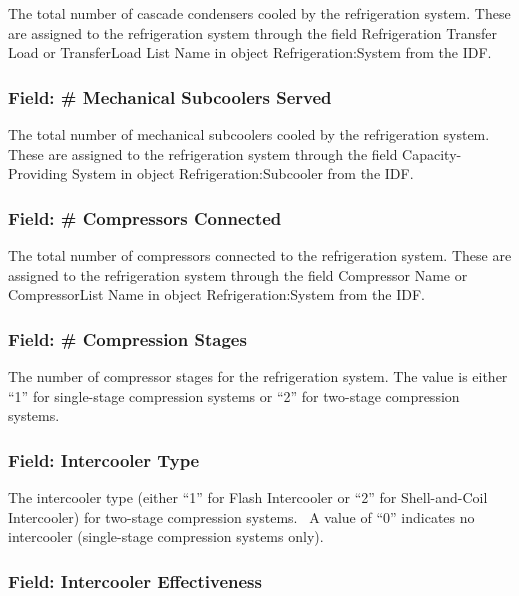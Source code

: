 The total number of cascade condensers cooled by the refrigeration system. These are assigned to the refrigeration system through the field Refrigeration Transfer Load or TransferLoad List Name in object Refrigeration:System from the IDF.

\subsubsection{Field: \# Mechanical Subcoolers Served}\label{field-mechanical-subcoolers-served}

The total number of mechanical subcoolers cooled by the refrigeration system. These are assigned to the refrigeration system through the field Capacity-Providing System in object Refrigeration:Subcooler from the IDF.

\subsubsection{Field: \# Compressors Connected}\label{field-compressors-connected}

The total number of compressors connected to the refrigeration system. These are assigned to the refrigeration system through the field Compressor Name or CompressorList Name in object Refrigeration:System from the IDF.

\subsubsection{Field: \# Compression Stages}\label{field-compression-stages}

The number of compressor stages for the refrigeration system. The value is either ``1'' for single-stage compression systems or ``2'' for two-stage compression systems.

\subsubsection{Field: Intercooler Type}\label{field-intercooler-type}

The intercooler type (either ``1'' for Flash Intercooler or ``2'' for Shell-and-Coil Intercooler) for two-stage compression systems.~ A value of ``0'' indicates no intercooler (single-stage compression systems only).

\subsubsection{Field: Intercooler Effectiveness}\label{field-intercooler-effectiveness}


